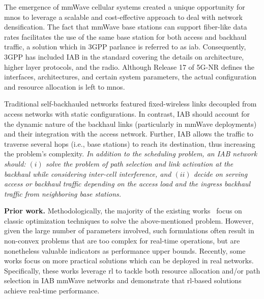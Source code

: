 The emergence of mmWave cellular systems created a unique opportunity for \glspl{mno} to leverage a scalable and cost-effective approach to deal with network densification. The fact that mmWave base stations can support fiber-like data rates facilitates the use of the same base station for both access and backhaul traffic, a solution which in 3GPP parlance is referred to as \gls{iab}. Consequently, 3GPP has included IAB in the standard \cite{3gpp.38.300, 3gpp_38_174} covering the details on architecture, higher layer protocols, and the radio. Although Release 17 of 5G-NR defines the interfaces, architectures, and certain system parameters, the actual configuration and resource allocation is left to \glspl{mno}.

Traditional self-backhauled networks featured fixed-wireless links decoupled from access networks with static configurations. In contrast, IAB should account for the dynamic nature of the backhaul links (particularly in mmWave deployments) and their integration with the access network. Further, IAB allows the traffic to traverse several hops (i.e., base stations) to reach its destination, thus increasing the problem's complexity. \textit{In addition to the scheduling problem, an IAB network should: $(i)$ solve the problem of path selection and link activation at the backhaul while considering inter-cell interference, and $(ii)$ decide on serving access or backhaul traffic depending on the access load and the ingress backhaul traffic from neighboring base stations.}

\textbf{Prior work.} Methodologically, the majority of the existing works~\cite{pan2017joint, alizadeh2019load, huang2015joint, nguyen2020nonsmooth, rasekh2015interference, kwon2019joint, pizzo2017optimal, kulkarni2018max,9839601} focus on classic optimization techniques to solve the above-mentioned problem. However, given the large number of parameters involved, such formulations often result in non-convex problems that are too complex for real-time operations, but are nonetheless valuable indicators as performance upper bounds. Recently, some works focus on more practical solutions which can be deployed in real networks\cite{lei2020deep, ZHANG2021108248, 9473755}. Specifically, these works leverage \gls{rl} to tackle both resource allocation and/or path selection in IAB mmWave networks and demonstrate that \gls{rl}-based solutions achieve real-time performance. 

